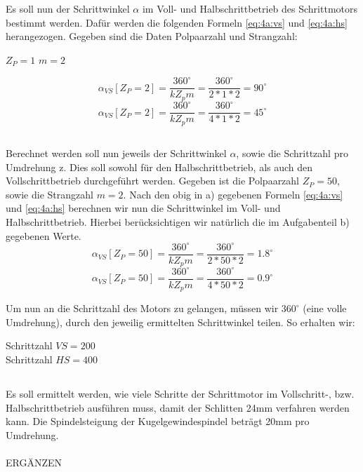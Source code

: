 \chapter{}\label{ch:aufg4}

\section{}\label{sec:4a}
Es soll nun der Schrittwinkel $ \alpha $ im Voll- und Halbschrittbetrieb des Schrittmotors bestimmt werden. Dafür werden die folgenden Formeln \ref{eq:4a:vs} und \ref{eq:4a:hs} herangezogen. Gegeben sind die Daten Polpaarzahl und Strangzahl: 
\begin{center}
	$ Z_{P} = 1 $ \hspace{2cm} $ m = 2 $ 
\end{center}

\begin{equation}
	\alpha_{VS}[Z_{P}=2] = \frac{360^{\circ}}{kZ_{p}m} = \frac{360^{\circ}}{2*1*2} = 90^{\circ}
	\label{eq:4a:vs}
\end{equation}
\begin{equation}
	\alpha_{VS}[Z_{P}=2] = \frac{360^{\circ}}{kZ_{p}m} = \frac{360^{\circ}}{4*1*2} = 45^{\circ}
	\label{eq:4a:hs}
\end{equation}

\section{}\label{sec:4b}
Berechnet werden soll nun jeweils der Schrittwinkel $ \alpha $, sowie die Schrittzahl pro Umdrehung z. Dies soll sowohl für den Halbschrittbetrieb, als auch den Vollschrittbetrieb durchgeführt werden. Gegeben ist die Polpaarzahl $ Z_{P} = 50 $, sowie die Strangzahl $ m = 2 $.
Nach den obig in a) gegebenen Formeln \ref{eq:4a:vs} und \ref{eq:4a:hs} berechnen wir nun die Schrittwinkel im Voll- und Halbschrittbetrieb. Hierbei berücksichtigen wir natürlich die im Aufgabenteil b) gegebenen Werte.
\begin{equation}
\alpha_{VS}[Z_{P}=50] = \frac{360^{\circ}}{kZ_{p}m} = \frac{360^{\circ}}{2*50*2} = 1.8^{\circ}
\label{eq:4b:vs}
\end{equation}
\begin{equation}
	\alpha_{VS}[Z_{P}=50] = \frac{360^{\circ}}{kZ_{p}m} = \frac{360^{\circ}}{4*50*2} = 0.9^{\circ}
	\label{eq:4b:hs}
\end{equation}

Um nun an die Schrittzahl des Motors zu gelangen, müssen wir $ 360^{\circ} $ (eine volle Umdrehung), durch den jeweilig ermittelten Schrittwinkel teilen. So erhalten wir:
\begin{center}
	Schrittzahl $ VS = 200 $\\
	Schrittzahl $ HS = 400 $
\end{center}

\section{}\label{sec:4c}
Es soll ermittelt werden, wie viele Schritte der Schrittmotor im Vollschritt-, bzw. Halbschrittbetrieb ausführen muss, damit der Schlitten 24mm verfahren werden kann. Die Spindelsteigung der Kugelgewindespindel beträgt 20mm pro Umdrehung.
\\\\
ERGÄNZEN
